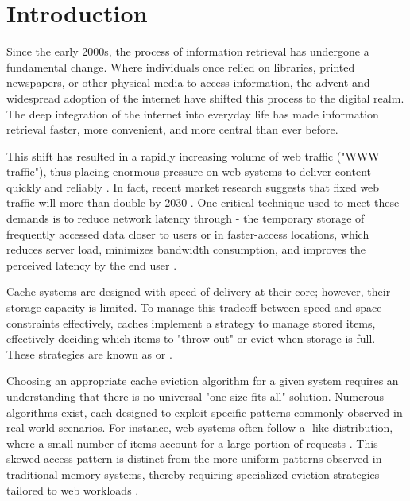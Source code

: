 \chapter{Introduction}\label{chapter:introduction}


Since the early 2000s, the process of information retrieval has undergone a fundamental change. Where individuals once relied on libraries, printed newspapers, or other physical media to access information, the advent and widespread adoption of the internet have shifted this process to the digital realm. The deep integration of the internet into everyday life has made information retrieval faster, more convenient, and more central than ever before.

This shift has resulted in a rapidly increasing volume of web traffic ("WWW traffic"), thus placing enormous pressure on web systems to deliver content quickly and reliably \cite{web-cache-overview}. In fact, recent market research suggests that fixed web traffic will more than double by 2030 \cite{digital-global-report}. One critical technique used to meet these demands is to reduce network latency through  - the temporary storage of frequently accessed data closer to users or in faster-access locations, which reduces server load, minimizes bandwidth consumption, and improves the perceived latency by the end user \cite{latency-caching, web-cache-overview}. 


Cache systems are designed with speed of delivery at their core; however, their storage capacity is limited. To manage this tradeoff between speed and space constraints effectively, caches implement a strategy to manage stored items, effectively deciding which items to "throw out" or evict when storage is full. These strategies are known as  or  \cite{web-cache-overview}.



Choosing an appropriate cache eviction algorithm for a given system requires an understanding that there is no universal "one size fits all" solution. Numerous algorithms exist, each designed to exploit specific patterns commonly observed in real-world scenarios. For instance, web systems often follow a -like distribution, where a small number of items account for a large portion of requests \cite{sieve, web-cache-overview}. This skewed access pattern is distinct from the more uniform patterns observed in traditional memory systems, thereby requiring specialized eviction strategies tailored to web workloads \cite{web-cache-overview}.


